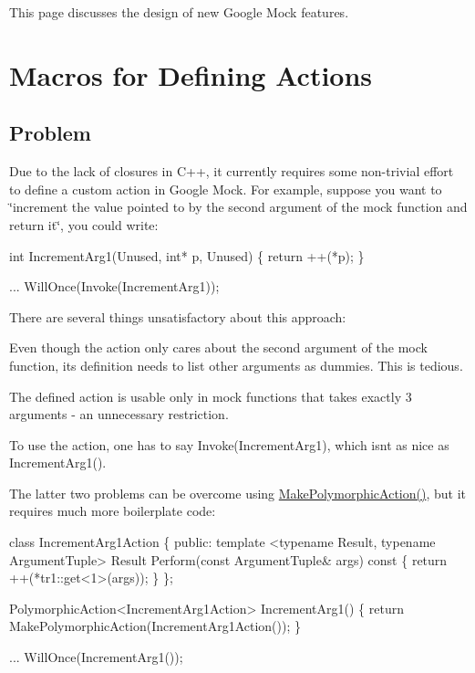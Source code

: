 This page discusses the design of new Google Mock features.

\section*{Macros for Defining Actions}

\subsection*{Problem}

Due to the lack of closures in C++, it currently requires some non-\/trivial effort to define a custom action in Google Mock. For example, suppose you want to \char`\"{}increment the value pointed to by the
second argument of the mock function and return it\char`\"{}, you could write\+:


\begin{DoxyCode}
int IncrementArg1(Unused, int* p, Unused) \{
  return ++(*p);
\}

... WillOnce(Invoke(IncrementArg1));
\end{DoxyCode}


There are several things unsatisfactory about this approach\+:


\begin{DoxyItemize}
\item Even though the action only cares about the second argument of the mock function, its definition needs to list other arguments as dummies. This is tedious.
\item The defined action is usable only in mock functions that takes exactly 3 arguments -\/ an unnecessary restriction.
\item To use the action, one has to say {\ttfamily Invoke(\+Increment\+Arg1)}, which isn\textquotesingle{}t as nice as {\ttfamily Increment\+Arg1()}.
\end{DoxyItemize}

The latter two problems can be overcome using {\ttfamily \hyperlink{namespacetesting_a36bd06c5ea972c6df0bd9f40a7a94c65}{Make\+Polymorphic\+Action()}}, but it requires much more boilerplate code\+:


\begin{DoxyCode}
class IncrementArg1Action \{
 public:
  template <typename Result, typename ArgumentTuple>
  Result Perform(const ArgumentTuple& args) const \{
    return ++(*tr1::get<1>(args));
  \}
\};

PolymorphicAction<IncrementArg1Action> IncrementArg1() \{
  return MakePolymorphicAction(IncrementArg1Action());
\}

... WillOnce(IncrementArg1());
\end{DoxyCode}


